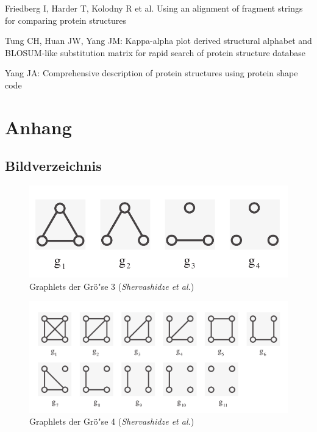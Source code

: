 \documentclass{report}
\begin{document}
Friedberg I, Harder T, Kolodny R et al. Using an alignment of fragment strings for comparing protein structures

Tung CH, Huan JW, Yang JM: Kappa-alpha plot derived structural alphabet and BLOSUM-like substitution matrix for rapid search of protein structure database






Yang JA: Comprehensive description of protein structures using protein shape code




\chapter{Anhang}


\section{Bildverzeichnis}

\begin{figure}[h!]
\includegraphics[width =\linewidth]{3graphlets.pdf}
\caption{Graphlets der Gr\"o"se 3 (\textit{Shervashidze et al.})}
\label{fig:3graphlets}
\end{figure}

\begin{figure}[h!]
\includegraphics[width =\linewidth]{4graphlets.pdf}
\caption{Graphlets der Gr\"o"se 4 (\textit{Shervashidze et al.})}
\label{fig:4graphlets2}
\end{figure}
\end{document}
